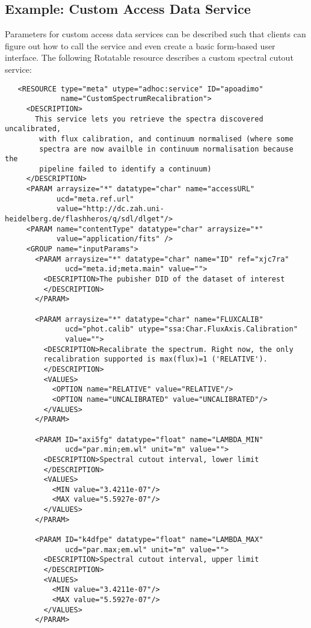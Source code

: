 \documentclass[11pt,a4paper]{ivoa}
\begin{document}
\subsection{Example: Custom Access Data Service}

Parameters for custom access data services can be described such that
clients can figure out how to call the service and even create a basic
form-based user interface. The following Rotatable resource describes
a custom spectral cutout service:
{\small
\begin{verbatim}
   <RESOURCE type="meta" utype="adhoc:service" ID="apoadimo" 
             name="CustomSpectrumRecalibration">
     <DESCRIPTION>
       This service lets you retrieve the spectra discovered uncalibrated,
        with flux calibration, and continuum normalised (where some 
        spectra are now availble in continuum normalisation because the 
        pipeline failed to identify a continuum)
     </DESCRIPTION>
     <PARAM arraysize="*" datatype="char" name="accessURL"
            ucd="meta.ref.url"
            value="http://dc.zah.uni-heidelberg.de/flashheros/q/sdl/dlget"/>
     <PARAM name="contentType" datatype="char" arraysize="*" 
            value="application/fits" />
     <GROUP name="inputParams">
       <PARAM arraysize="*" datatype="char" name="ID" ref="xjc7ra"
              ucd="meta.id;meta.main" value="">
         <DESCRIPTION>The pubisher DID of the dataset of interest
         </DESCRIPTION>
       </PARAM>

       <PARAM arraysize="*" datatype="char" name="FLUXCALIB"
              ucd="phot.calib" utype="ssa:Char.FluxAxis.Calibration"
              value="">
         <DESCRIPTION>Recalibrate the spectrum. Right now, the only
         recalibration supported is max(flux)=1 ('RELATIVE').
         </DESCRIPTION>
         <VALUES>
           <OPTION name="RELATIVE" value="RELATIVE"/>
           <OPTION name="UNCALIBRATED" value="UNCALIBRATED"/>
         </VALUES>
       </PARAM>

       <PARAM ID="axi5fg" datatype="float" name="LAMBDA_MIN"
              ucd="par.min;em.wl" unit="m" value="">
         <DESCRIPTION>Spectral cutout interval, lower limit
         </DESCRIPTION>
         <VALUES>
           <MIN value="3.4211e-07"/>
           <MAX value="5.5927e-07"/>
         </VALUES>
       </PARAM>

       <PARAM ID="k4dfpe" datatype="float" name="LAMBDA_MAX"
              ucd="par.max;em.wl" unit="m" value="">
         <DESCRIPTION>Spectral cutout interval, upper limit
         </DESCRIPTION>
         <VALUES>
           <MIN value="3.4211e-07"/>
           <MAX value="5.5927e-07"/>
         </VALUES>
       </PARAM>


\end{verbatim}}
\end{document}

